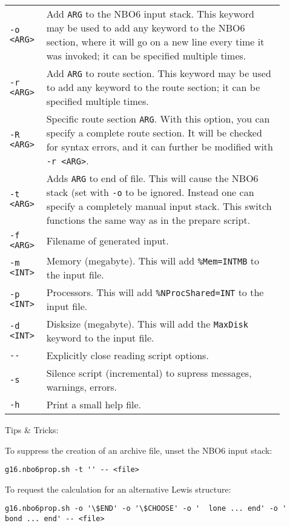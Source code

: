 \documentclass[   %
  final,          %
  a4paper         %
]{article}
\begin{document}
\begin{longtable}{p{0.1\linewidth}p{0.8\linewidth}}
  {\lstinline`-o <ARG>`} & Add {\lstinline`ARG`} to the NBO6 input stack.
    This keyword may be used to add any keyword to the NBO6 section, 
    where it will go on a new line every time it was invoked; 
    it can be specified multiple times.\\
  {\lstinline`-r <ARG>`} & Add {\lstinline`ARG`} to route section. 
    This keyword may be used to add any keyword to the route section; 
    it can be specified multiple times.\\
  {\lstinline`-R <ARG>`} & Specific route section {\lstinline`ARG`}. 
    With this option, you can specify a complete route section. 
    It will be checked for syntax errors, and it can further be modified with {\lstinline`-r <ARG>`}. \\
  {\lstinline`-t <ARG>`} & Adds {\lstinline`ARG`} to end of file. 
    This will cause the NBO6 stack (set with \lstinline`-o` to be ignored.
    Instead one can specify a completely manual input stack.
    This switch functions the same way as in the prepare script. \\
  {\lstinline`-f <ARG>`} & Filename of generated input. \\
  {\lstinline`-m <INT>`} & Memory (megabyte). This will add \texttt{\%Mem={\lstinline`INT`}MB} to the input file. \\
  {\lstinline`-p <INT>`} & Processors. This will add \texttt{\%NProcShared={\lstinline`INT`}} to the input file. \\
  {\lstinline`-d <INT>`} & Disksize (megabyte). This will add the \texttt{MaxDisk} keyword to the input file. \\
  {\lstinline`--`}       & Explicitly close reading script options. \\
  {\lstinline`-s`}       & Silence script (incremental) to supress messages, warnings, errors. \\
  {\lstinline`-h`}       & Print a small help file. \\
\end{longtable}

Tips \& Tricks:

To suppress the creation of an archive file, unset the NBO6 input stack:

\lstinline`g16.nbo6prop.sh -t '' -- <file>`

To request the calculation for an alternative Lewis structure:

\lstinline`g16.nbo6prop.sh -o '\$END' -o '\$CHOOSE' -o '  lone ... end' -o '  bond ... end' -- <file>`
\end{document}
